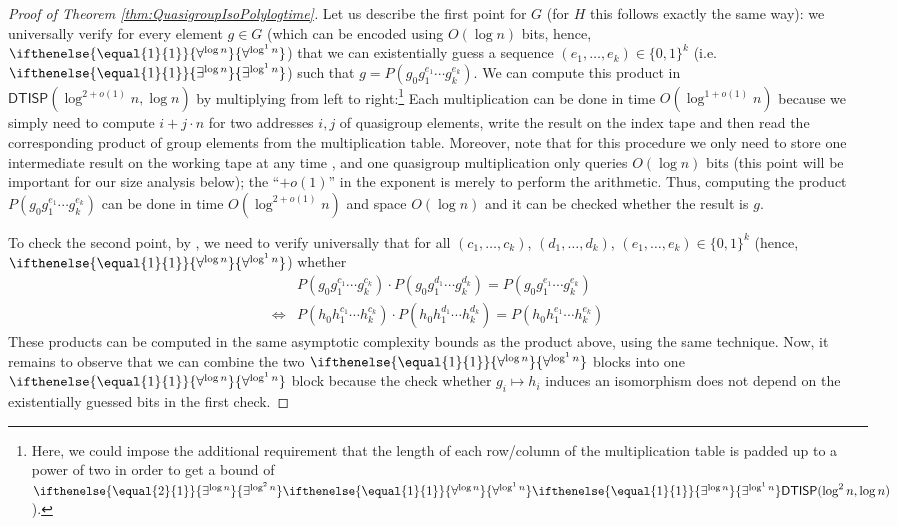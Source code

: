 \documentclass{theoretics}
\newcommand{\betacc}[1]{\ifthenelse{\equal{#1}{1}}{\exists^{\log n}}{\exists^{\log^{#1}n}}} %
\newcommand{\alphacc}[1]{\ifthenelse{\equal{#1}{1}}{\forall^{\log n}}{\forall^{\log^{#1}n}}} %
\newcommand{\Oh}{O}
\newcommand*{\ComplexityClass}[1]{\ensuremath{\mathsf{#1}}\xspace}
\newcommand{\DTISP}{\ComplexityClass{DTISP}}
\begin{document}
\begin{proof}[Proof of Theorem \ref{thm:QuasigroupIsoPolylogtime}]
Let us describe the first point for $G$ (for $H$ this follows exactly the same way): we universally verify for every element $g \in G$ (which can be encoded using $\Oh(\log n)$ bits, hence, $\alphacc{1}$) that we can existentially guess a sequence $(e_1, \dots, e_k) \in \{0,1\}^k$ (i.e.\ $\betacc{1}$) such that $g = P(g_0g_1^{e_1} \cdots g_k^{e_k})$. 
We can compute this product in $\DTISP(\log^{2+o(1)} n, \log n)$ by multiplying from left to right:\footnote{Here, we could impose the additional requirement that the length of each row/column of the multiplication table is padded up to a power of two in order to get a bound of $\betacc{2}\alphacc{1}\betacc{1}\DTISP(\log^2n,\log n)$).\label{fn:16}} Each multiplication can be done in time $\Oh(\log^{1+o(1)} n)$ because we simply need to compute $i+j\cdot n$ for two addresses $i,j$ of quasigroup elements, write the result on the index tape and then read the corresponding product of group elements from the multiplication table. Moreover, note that for this procedure we only need to store one intermediate result on the working tape at any time
, and one quasigroup multiplication only queries $O(\log n)$ bits (this point will be important for our size analysis below); the ``$+o(1)$'' in the exponent is merely to perform the arithmetic. 
Thus, computing the product $P(g_0g_1^{e_1} \cdots g_k^{e_k})$ can be done in time $\Oh(\log^{2+o(1)} n)$ and space $\Oh(\log n)$ and it can be checked whether the result is $g$.

To check the second point, by \cite{ChattopadhyayToranWagner}, we need to verify universally that for all $(c_1, \dots, c_k)$, $(d_1, \dots, d_k)$, $(e_1, \dots, e_k) \in \{0,1\}^k$ (hence, $\alphacc{1}$) whether 
\begin{align*}
& P(g_0g_1^{c_1} \cdots g_k^{c_k})\cdot P(g_0g_1^{d_1} \cdots g_k^{d_k}) = P(g_0g_1^{e_1} \cdots g_k^{e_k}) \\
 \iff & P(h_0h_1^{c_1} \cdots h_k^{c_k})\cdot P(h_0h_1^{d_1} \cdots h_k^{d_k}) = P(h_0h_1^{e_1} \cdots h_k^{e_k})
\end{align*}
These products can be computed in the same asymptotic complexity bounds as the product above, using the same technique. Now, it remains to observe that we can combine the two $\alphacc{1}$ blocks into one  $\alphacc{1}$ block because the check whether $g_i \mapsto h_i$ induces an isomorphism does not depend on the existentially guessed bits in the first check.


\end{proof}
\end{document}
